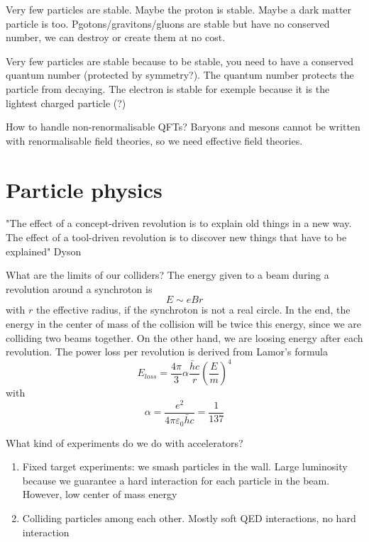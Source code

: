 \documentclass[a4paper]{book}
\theoremstyle{definition}
\theoremstyle{remark}
\begin{document}
Very few particles are stable. Maybe the proton is stable. Maybe a dark matter particle is too. Pgotons/gravitons/gluons are stable but have no conserved number, we can destroy or create them at no cost. \par \medskip 

Very few particles are stable because to be stable, you need to have a conserved quantum number (protected by symmetry?). The quantum number protects the particle from decaying. The electron is stable for exemple because it is the lightest charged particle (?) \par \medskip 

How to handle non-renormalisable QFTs? Baryons and mesons cannot be written with renormalisable field theories, so we need effective field theories. \par \medskip 


\chapter{Particle physics}

"The effect of a concept-driven revolution is to explain old things in a new way. The effect of a tool-driven revolution is to discover new things that have to be explained" Dyson \par \medskip 

What are the limits of our colliders? The energy given to a beam during a revolution around a synchroton is 
\begin{equation}
    E \sim eBr
\end{equation}
with $r$ the effective radius, if the synchroton is not a real circle. In the end, the energy in the center of mass of the collision will be twice this energy, since we are colliding two beams together. On the other hand, we are loosing energy after each revolution. The power loss per revolution is derived from Lamor's formula
\begin{equation}
    E_{loss} = \frac{4\pi}{3}\alpha \frac{\bar{h}c}{r}\left(\frac{E}{m}\right)^4
\end{equation}
with 
\begin{equation}
    \alpha = \frac{e^2}{4\pi \varepsilon_0\bar{h}c} = \frac{1}{137}
\end{equation}

What kind of experiments do we do with accelerators? 
\begin{enumerate}
    \item Fixed target experiments: we smash particles in the wall. Large luminosity because we guarantee a hard interaction for each particle in the beam. However, low center of mass energy 
    \item Colliding particles among each other. Mostly soft QED interactions, no hard interaction
\end{enumerate}
\end{document}
